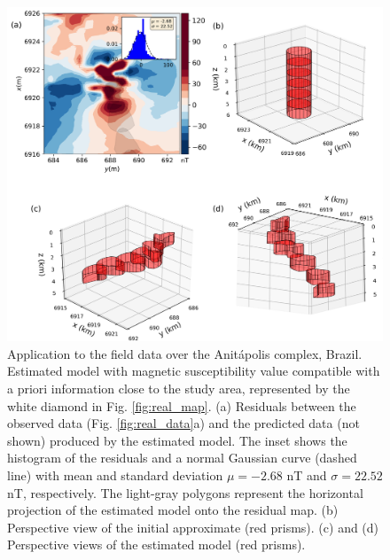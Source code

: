 \begin{figure}
    \centering
    \includegraphics[width=\linewidth]{figures/real_results_white_diamond.png}
    \caption{Application to the field data over the Anit{\'a}polis complex, Brazil.
    Estimated model with magnetic susceptibility value compatible with 
    a priori information close to the study area, 
    represented by the white diamond in Fig. \ref{fig:real_map}. 
    (a) Residuals between the observed data (Fig. \ref{fig:real_data}a) and the 
    predicted data (not shown) produced by the estimated model. 
    The inset shows the histogram of the residuals and a normal 
    Gaussian curve (dashed line) with mean and standard deviation 
    $\mu = -2.68$ nT and $\sigma = 22.52$ nT, respectively.
    The light-gray polygons represent the horizontal projection of the estimated 
    model onto the residual map. 
    (b) Perspective view of the initial approximate (red prisms). 
    (c) and (d) Perspective views of the estimated model (red prisms).}
    \label{fig:real_result}
\end{figure}